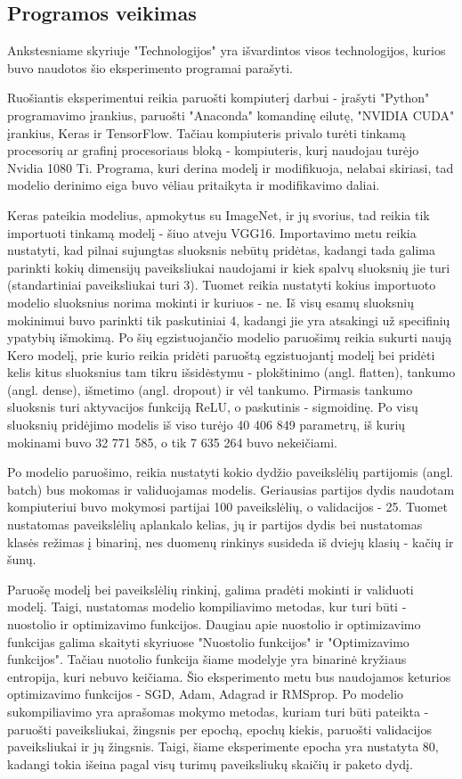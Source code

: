 \documentclass{VUMIFPSkursinis}
\begin{document}
\subsection{Programos veikimas}
Ankstesniame skyriuje "Technologijos" yra išvardintos visos technologijos, kurios buvo naudotos šio eksperimento programai parašyti.

Ruošiantis eksperimentui reikia paruošti kompiuterį darbui - įrašyti "Python" programavimo įrankius, paruošti "Anaconda" komandinę eilutę, "NVIDIA CUDA" įrankius, Keras ir 
TensorFlow. Tačiau kompiuteris privalo turėti tinkamą procesorių ar grafinį procesoriaus bloką - kompiuteris, kurį naudojau turėjo Nvidia 1080 Ti. Programa, kuri 
derina modelį ir modifikuoja, nelabai skiriasi, tad modelio derinimo eiga buvo vėliau pritaikyta ir modifikavimo daliai. 
 
Keras pateikia modelius, apmokytus su ImageNet, ir jų svorius, tad reikia tik importuoti 
tinkamą modelį - šiuo atveju VGG16. Importavimo metu reikia nustatyti, kad pilnai sujungtas sluoksnis nebūtų pridėtas, kadangi tada galima parinkti kokių dimensijų 
paveiksliukai naudojami ir kiek spalvų sluoksnių jie turi (standartiniai paveiksliukai turi 3). Tuomet reikia nustatyti kokius importuoto modelio sluoksnius norima 
mokinti ir kuriuos - ne. Iš visų esamų sluoksnių mokinimui buvo parinkti tik paskutiniai 4, kadangi jie yra atsakingi už specifinių ypatybių išmokimą. Po šių egzistuojančio 
modelio paruošimų reikia sukurti naują Kero modelį, prie kurio reikia pridėti paruoštą egzistuojantį modelį bei pridėti kelis kitus sluoksnius tam tikru išsidėstymu - 
plokštinimo (angl. flatten), tankumo (angl. dense), išmetimo (angl. dropout) ir vėl tankumo. Pirmasis tankumo sluoksnis turi aktyvacijos funkciją ReLU, o paskutinis - sigmoidinę. Po visų sluoksnių pridėjimo modelis iš 
viso turėjo 40 406 849 parametrų, iš kurių mokinami buvo 32 771 585, o tik 7 635 264 buvo nekeičiami. 

Po modelio paruošimo, reikia nustatyti kokio dydžio paveikslėlių partijomis (angl. batch) bus mokomas ir validuojamas modelis. Geriausias partijos dydis naudotam kompiuteriui buvo mokymosi partijai 100 paveikslėlių, o validacijos - 25.
Tuomet nustatomas paveikslėlių aplankalo kelias, jų ir partijos dydis bei nustatomas klasės režimas į binarinį, nes duomenų rinkinys susideda iš dviejų klasių - kačių ir šunų.

Paruošę modelį bei paveikslėlių rinkinį, galima pradėti mokinti ir validuoti modelį. Taigi, nustatomas modelio kompiliavimo metodas, kur turi būti - nuostolio ir 
optimizavimo funkcijos. Daugiau apie nuostolio ir optimizavimo funkcijas galima skaityti skyriuose "Nuostolio funkcijos" ir "Optimizavimo funkcijos". Tačiau nuotolio 
funkcija šiame modelyje yra binarinė kryžiaus entropija, kuri nebuvo keičiama. Šio eksperimento metu bus naudojamos keturios optimizavimo funkcijos - SGD, 
Adam, Adagrad ir RMSprop. Po modelio sukompiliavimo yra aprašomas mokymo metodas, kuriam turi būti pateikta - paruošti paveiksliukai, žingsnis per epochą, epochų kiekis, 
paruošti validacijos paveiksliukai ir jų žingsnis. Taigi, šiame eksperimente epocha yra nustatyta 80, kadangi tokia išeina pagal visų turimų paveiksliukų skaičių ir paketo dydį.
\end{document}
